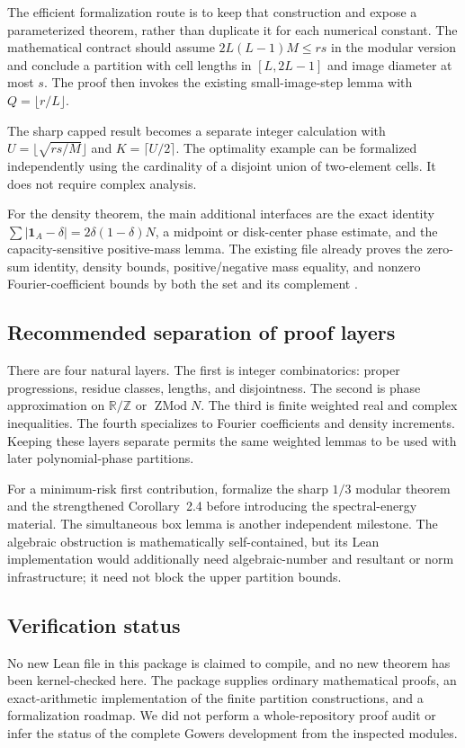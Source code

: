 \documentclass[11pt,letterpaper]{article}
\numberwithin{equation}{section}
\theoremstyle{definition}
\theoremstyle{remark}
\newcommand{\R}{\mathbb R}
\newcommand{\Z}{\mathbb Z}
\newcommand{\one}{\mathbf 1}
\newcommand{\1}{\mathbf 1}
\begin{document}
The efficient formalization route is to keep that construction and expose a parameterized theorem, rather than duplicate it for each numerical constant. The mathematical contract should assume $2L(L-1)M\leq rs$ in the modular version and conclude a partition with cell lengths in $[L,2L-1]$ and image diameter at most $s$. The proof then invokes the existing small-image-step lemma with $Q=\lfloor r/L\rfloor$.

The sharp capped result becomes a separate integer calculation with $U=\lfloor\sqrt{rs/M}\rfloor$ and $K=\lceil U/2\rceil$. The optimality example can be formalized independently using the cardinality of a disjoint union of two-element cells. It does not require complex analysis.

For the density theorem, the main additional interfaces are the exact identity $\sum|\one_A-\delta|=2\delta(1-\delta)N$, a midpoint or disk-center phase estimate, and the capacity-sensitive positive-mass lemma. The existing file already proves the zero-sum identity, density bounds, positive/negative mass equality, and nonzero Fourier-coefficient bounds by both the set and its complement \cite{repo05density}.

\subsection{Recommended separation of proof layers}
There are four natural layers. The first is integer combinatorics: proper progressions, residue classes, lengths, and disjointness. The second is phase approximation on $\R/\Z$ or $\operatorname{ZMod}N$. The third is finite weighted real and complex inequalities. The fourth specializes to Fourier coefficients and density increments. Keeping these layers separate permits the same weighted lemmas to be used with later polynomial-phase partitions.

For a minimum-risk first contribution, formalize the sharp $1/3$ modular theorem and the strengthened Corollary~2.4 before introducing the spectral-energy material. The simultaneous box lemma is another independent milestone. The algebraic obstruction is mathematically self-contained, but its Lean implementation would additionally need algebraic-number and resultant or norm infrastructure; it need not block the upper partition bounds.

\subsection{Verification status}
No new Lean file in this package is claimed to compile, and no new theorem has been kernel-checked here. The package supplies ordinary mathematical proofs, an exact-arithmetic implementation of the finite partition constructions, and a formalization roadmap. We did not perform a whole-repository proof audit or infer the status of the complete Gowers development from the inspected modules.
\end{document}
